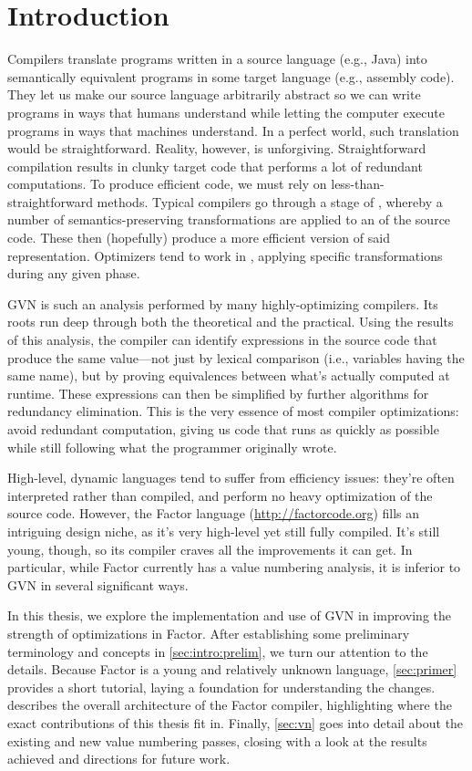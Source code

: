 \section{Introduction}\label{sec:intro}

Compilers translate programs written in a source language (e.g., Java) into
semantically equivalent programs in some target language (e.g., assembly code).
They let us make our source language arbitrarily abstract so we can write
programs in ways that humans understand while letting the computer execute
programs in ways that machines understand.  In a perfect world, such
translation would be straightforward.  Reality, however, is unforgiving.
Straightforward compilation results in clunky target code that performs a lot
of redundant computations.  To produce efficient code, we must rely on
less-than-straightforward methods.  Typical compilers go through a stage of
, whereby a number of semantics-preserving transformations
are applied to an  of the source code.  These then
(hopefully) produce a more efficient version of said representation.
Optimizers tend to work in , applying specific transformations
during any given phase.

\Gls{GVN} is such an analysis performed by many highly-optimizing compilers.
Its roots run deep through both the theoretical and the practical.  Using the
results of this analysis, the compiler can identify expressions in the source
code that produce the same value---not just by lexical comparison (i.e.,
variables having the same name), but by proving equivalences between what's
actually computed at runtime.  These expressions can then be simplified by
further algorithms for redundancy elimination.  This is the very essence of
most compiler optimizations: avoid redundant computation, giving us code that
runs as quickly as possible while still following what the programmer
originally wrote.

High-level, dynamic languages tend to suffer from efficiency issues: they're
often interpreted rather than compiled, and perform no heavy optimization of
the source code.  However, the Factor language (\url{http://factorcode.org})
fills an intriguing design niche, as it's very high-level yet still fully
compiled.  It's still young, though, so its compiler craves all the
improvements it can get.  In particular, while Factor currently has a
 value numbering analysis, it is inferior to \gls{GVN} in several
significant ways.

In this thesis, we explore the implementation and use of \gls{GVN} in improving
the strength of optimizations in Factor.  After establishing some preliminary
terminology and concepts in \cref{sec:intro:prelim}, we turn our attention to
the details.  Because Factor is a young and relatively unknown language,
\cref{sec:primer} provides a short tutorial, laying a foundation for
understanding the changes.   describes the overall
architecture of the Factor compiler, highlighting where the exact contributions
of this thesis fit in.  Finally, \cref{sec:vn} goes into detail about the
existing and new value numbering passes, closing with a look at the results
achieved and directions for future work. 

